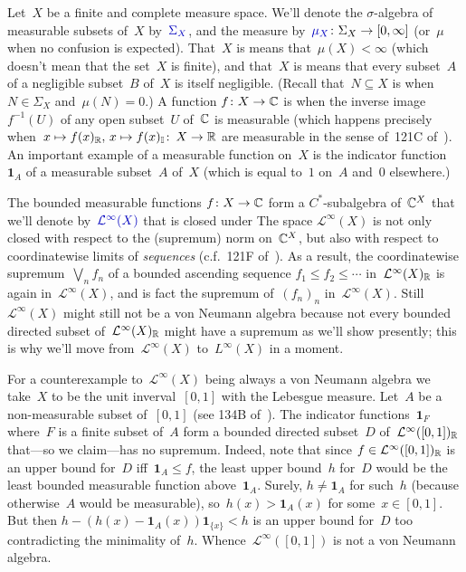 \documentclass[a]{subfiles}
\begin{document}
\begin{parsec}%
\begin{point}%
Let~$X$ be a finite and complete measure space.
We'll denote the $\sigma$-algebra
of measurable subsets of~$X$ by~$\Define{\Sigma_X}$,
and the measure by~$\Define{\mu_X}\colon \Sigma_X\to[0,\infty]$ (or~$\mu$
when no confusion is expected).
That~$X$ is  means that~$\mu(X)<\infty$
(which doesn't mean that the set~$X$ is finite),
and that~$X$ is 
means that every subset~$A$
of a negligible subset~$B$ of~$X$
is itself negligible.
(Recall that~$N\subseteq X$
is 
when~$N\in \Sigma_X$ and~$\mu(N)=0$.)
A function $f\colon X\to\mathbb{C}$ is 
when the inverse image~$f^{-1}(U)$
of any open subset~$U$ of~$\mathbb{C}$
is measurable
(which happens precisely
when~$x\mapsto f(x)_{\mathbb{R}},\,x\mapsto f(x)_{\mathbb{I}}\colon\,
X\to\mathbb{R}$
are measurable in the sense of~121C of~\cite{fremlin}).
An important example of a measurable function on~$X$
is the indicator function~$\mathbf{1}_A$
of a measurable subset~$A$ of~$X$
(which is equal to~$1$ on~$A$ and~$0$ elsewhere.)
\end{point}
\begin{point}%
The bounded measurable functions $f\colon X\to\mathbb{C}$
form a $C^*$-subalgebra of~$\mathbb{C}^X$ 
that we'll denote by~$\Define{\mathcal{L}^\infty(X)}$
that is closed under 
The space $\mathcal{L}^\infty(X)$
is not only closed with respect to the (supremum) norm
on~$\mathbb{C}^X$,
but also with respect to coordinatewise limits
of \emph{sequences}
(c.f.~121F of~\cite{fremlin}).
As a result,
the coordinatewise
supremum~$\bigvee_n f_n$
of a bounded ascending sequence $f_1\leq f_2\leq \dotsb$
in~$\mathcal{L}^\infty(X)_{\mathbb{R}}$
is again in~$\mathcal{L}^\infty(X)$,
and is fact the supremum of~$(f_n)_n$ in~$\mathcal{L}^\infty(X)$.
Still $\mathcal{L}^\infty(X)$
might still not be a von Neumann algebra
because not every bounded directed subset of~$\mathcal{L}^\infty(X)_{\mathbb{R}}$
might have a supremum
as we'll show presently; 
this is why we'll move from~$\mathcal{L}^\infty(X)$
to~$L^\infty(X)$ in a moment.
\end{point}
\begin{point}%
For a counterexample
to~$\mathcal{L}^\infty(X)$ being always
a von Neumann algebra
we take~$X$ to be the unit inverval~$[0,1]$
with the Lebesgue measure.
Let~$A$ be a non-measurable
subset of~$[0,1]$ (see 134B of~\cite{fremlin}).
The indicator functions~$\mathbf{1}_F$
where~$F$ is a finite subset of~$A$
form a bounded directed subset~$D$ of~$\mathcal{L}^\infty([0,1])_{\mathbb{R}}$
that---so we claim---has no supremum.
Indeed, note that
since $f\in \mathcal{L}^\infty([0,1])_{\mathbb{R}}$
is an upper bound for~$D$ iff~$\mathbf{1}_A\leq f$,
the least upper bound~$h$ for~$D$
would be the least bounded measurable function above~$\mathbf{1}_A$.
Surely, $h\neq \mathbf{1}_A$
for such~$h$
(because otherwise~$A$ would be measurable),
so~$h(x)>\mathbf{1}_A(x)$ for some~$x\in [0,1]$.
But then $h - (h(x)-\mathbf{1}_A(x))\mathbf{1}_{\{x\}}<h$
is an upper bound for~$D$ too
contradicting the minimality of~$h$.
Whence~$\mathcal{L}^\infty([0,1])$
is not a von Neumann algebra.


\end{point}
\end{parsec}
\end{document}
